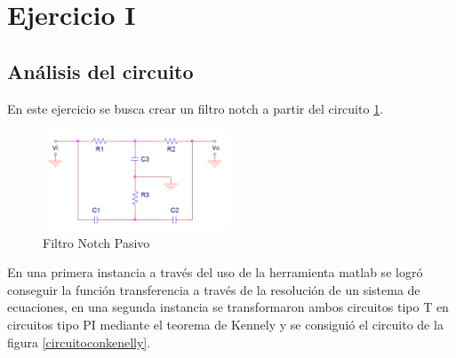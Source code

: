 



%
\section{Ejercicio I}
\subsection{Análisis del circuito}
En este ejercicio se busca crear un filtro notch a partir del circuito \ref{fig:circuito_1}. 

\begin{figure}[H]                                                       
    \centering
    	\includegraphics[width=0.5\textwidth]{resources/circuito_1.png}
    	\caption{Filtro Notch Pasivo}
    	\label{fig:circuito_1}
\end{figure}

En una primera instancia a través del uso de la herramienta matlab se logró conseguir la función transferencia a través de la resolución de un sistema de ecuaciones, en una segunda instancia se transformaron ambos circuitos tipo T en circuitos tipo PI mediante el teorema de Kennely y se consiguió el circuito de la figura \ref{circuitoconkenelly}.

